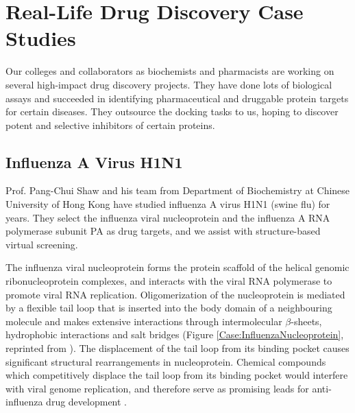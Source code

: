 \chapter{Real-Life Drug Discovery Case Studies}

Our colleges and collaborators as biochemists and pharmacists are working on several high-impact drug discovery projects. They have done lots of biological assays and succeeded in identifying pharmaceutical and druggable protein targets for certain diseases. They outsource the docking tasks to us, hoping to discover potent and selective inhibitors of certain proteins.

\section{Influenza A Virus H1N1}

Prof. Pang-Chui Shaw and his team from Department of Biochemistry at Chinese University of Hong Kong have studied influenza A virus H1N1 (swine flu) for years. They select the influenza viral nucleoprotein and the influenza A RNA polymerase subunit PA as drug targets, and we assist with structure-based virtual screening.

The influenza viral nucleoprotein forms the protein scaffold of the helical genomic ribonucleoprotein complexes, and interacts with the viral RNA polymerase to promote viral RNA replication. Oligomerization of the nucleoprotein is mediated by a flexible tail loop that is inserted into the body domain of a neighbouring molecule and makes extensive interactions through intermolecular $\beta$-sheets, hydrophobic interactions and salt bridges \citep{1140} (Figure \ref{Case:InfluenzaNucleoprotein}, reprinted from \citep{1140}). The displacement of the tail loop from its binding pocket causes significant structural rearrangements in nucleoprotein. Chemical compounds which competitively displace the tail loop from its binding pocket would interfere with viral genome replication, and therefore serve as promising leads for anti-influenza drug development \citep{1140}.

